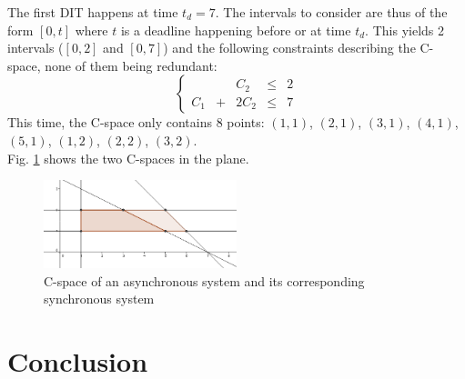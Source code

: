 \documentclass[times, 10pt,twocolumn, a4paper]{article}
\begin{document}
The first DIT happens at time $t_d = 7$. The intervals to consider are thus of the form $[0, t]$ where $t$ is a deadline happening before or at time $t_d$. This yields 2 intervals ($[0, 2]$ and $[0, 7]$) and the following constraints describing the C-space, none of them being redundant:
$$
\left\{
	\begin{array}{ccccc}
		& & C_2 & \leqslant & 2 \\
		C_1 & + & 2 C_2 & \leqslant & 7
	\end{array}
\right.
$$
This time, the C-space only contains 8 points: $(1, 1)$, $(2, 1)$, $(3, 1)$, $(4, 1)$, $(5, 1)$, $(1, 2)$, $(2, 2)$, $(3, 2)$.\\

Fig. \ref{fig:cspaceComp} shows the two C-spaces in the plane.

\begin{figure}[h]
\begin{center}
	\includegraphics[width=0.5\textwidth]{figs/cspace_example.png}
	\caption{C-space of an asynchronous system and its corresponding synchronous system}
	\label{fig:cspaceComp}
\end{center}
\end{figure}

\section{Conclusion}



\end{document}

